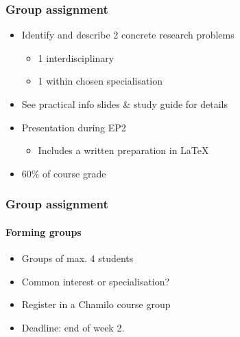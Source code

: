\documentclass[aspectratio=169]{beamer}
\begin{document}
      \begin{frame}
      \frametitle{Group assignment}
      
      \begin{itemize}
          \item Identify and describe 2 concrete research problems
          \begin{itemize}
              \item 1 interdisciplinary 
              \item 1 within chosen specialisation
          \end{itemize}
          \item See practical info slides \& study guide for details
          \item Presentation during EP2
          \begin{itemize}
            \item Includes a written preparation in \LaTeX
        \end{itemize}
        \item 60\% of course grade
      \end{itemize}
      
  \end{frame}
  
      \begin{frame}
      \frametitle{Group assignment}
              \framesubtitle{Forming groups}
      
      \begin{itemize}
          \item Groups of max. 4 students
          \item Common interest or specialisation?
          \item Register in a Chamilo course group
          \item Deadline: end of week 2.
      \end{itemize}
      
  \end{frame}
    
\end{document}
